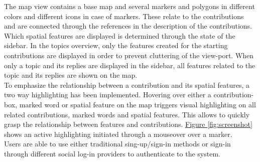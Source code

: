 The map view contains a base map and several markers and polygons in different colors and different icons in case of markers. These relate to the contributions and are connected through the references in the description of the contributions. Which spatial features are displayed is determined through the state of the sidebar. In the topics overview, only the features created for the starting contributions are displayed in order to prevent cluttering of the view-port. When only a topic and its replies are displayed in the sidebar, all features related to the topic and its replies are shown on the map.\\
To emphasize the relationship between a contribution and its spatial features, a two way highlighting has been implemented. Hovering over either a contribution-box, marked word or spatial feature on the map triggers visual highlighting on all related contributions, marked words and spatial features. This allows to quickly grasp the relationship between features and contributions. \hyperref[fig:screenshot]{Figure \ref{fig:screenshot}} shows an active highlighting initiated through a mouseover over a marker.\\
Users are able to use either traditional sing-up/sign-in methods or sign-in through different social log-in providers to authenticate to the system.


